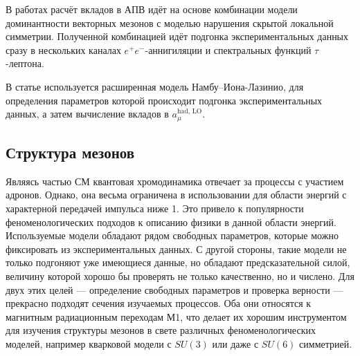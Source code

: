 В работах \cite{Benayoun:2016krn, Jegerlehner:2017gek}
расчёт вкладов в АПВ идёт на основе комбинации модели доминантности векторных мезонов
с моделью нарушения скрытой локальной симметрии.
Полученной комбинацией идёт подгонка экспериментальных данных сразу в нескольких каналах $e^+ e^-$-аннигиляции
и спектральных функций $\tau$-лептона.

В статье \cite{Ahmadov:2010hq}
используется расширенная модель Намбу--Иона-Лазинио,
для определения параметров которой происходит подгонка экспериментальных данных,
а затем вычисление вкладов в $a_\mu^{\text{had, LO}}$.



\subsection{Структура мезонов}
\label{meson-structures}

Являясь частью СМ квантовая хромодинамика отвечает за процессы с участием адронов. Однако, она весьма ограничена в использовании для области энергий с характерной передачей импульса ниже \SI{1}{\GeVr}.
Это привело к популярности феноменологических подходов к описанию физики в данной области энергий.
Используемые модели обладают рядом свободных параметров,
которые можно фиксировать из экспериментальных данных.
С другой стороны,
такие модели не только подгоняют уже имеющиеся данные,
но обладают предсказательной силой,
величину которой хорошо бы проверять не только качественно,
но и числено.
Для двух этих целей --- определение свободных параметров и проверка верности ---
прекрасно подходят сечения изучаемых процессов.
Оба они относятся к магнитным радиационным переходам М1,
что делает их хорошим инструментом для изучения структуры мезонов в свете различных феноменологических моделей,
например кварковой модели с $SU(3)$ или даже с $SU(6)$ симметрией.

